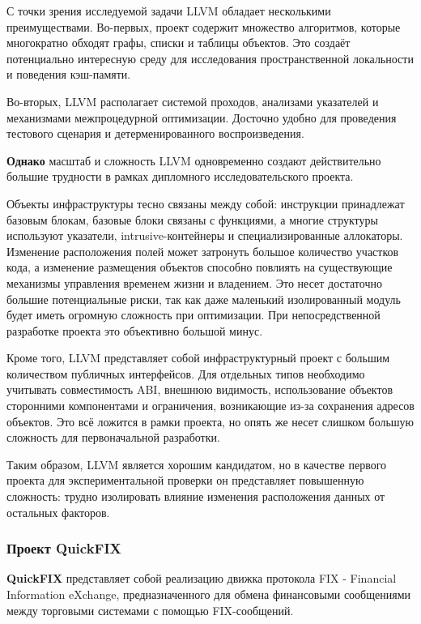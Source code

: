 \documentclass[a4paper,12pt]{article}
\begin{document}
С точки зрения исследуемой задачи LLVM обладает несколькими преимуществами. Во-первых, 
проект содержит множество алгоритмов, которые многократно обходят
графы, списки и таблицы объектов. Это создаёт потенциально интересную среду
для исследования пространственной локальности и поведения кэш-памяти.

Во-вторых, LLVM располагает системой проходов, анализами 
указателей и механизмами межпроцедурной оптимизации. Досточно удобно для
проведения тестового сценария и детерменированного воспроизведения.

\textbf{Однако} масштаб и сложность LLVM одновременно создают действительно большие 
трудности в рамках дипломного исследовательского проекта.

Объекты инфраструктуры тесно связаны между собой: инструкции принадлежат
базовым блокам, базовые блоки связаны с функциями, а многие структуры
используют указатели, intrusive-контейнеры и специализированные аллокаторы.
Изменение расположения полей может затронуть большое количество участков
кода, а изменение размещения объектов способно повлиять на существующие
механизмы управления временем жизни и владением. Это несет достаточно большие
потенциальные риски, так как даже маленький изолированный модуль будет иметь
огромную сложность при оптимизации. При непосредственной разработке проекта это
объективно большой минус.

Кроме того, LLVM представляет собой инфраструктурный проект с большим
количеством публичных интерфейсов. Для отдельных типов необходимо учитывать
совместимость ABI, внешнюю видимость, использование объектов сторонними
компонентами и ограничения, возникающие из-за сохранения адресов объектов. Это
всё ложится в рамки проекта, но опять же несет слишком большую сложность для
первоначальной разработки.

Таким образом, LLVM является хорошим кандидатом, но в качестве первого проекта для 
экспериментальной проверки он представляет повышенную сложность: трудно изолировать влияние
изменения расположения данных от остальных факторов.

\subsubsection{Проект QuickFIX}

\textbf{QuickFIX} представляет собой реализацию движка протокола FIX - 
Financial Information eXchange, предназначенного для обмена финансовыми
сообщениями между торговыми системами с помощью FIX-сообщений. 
\end{document}
